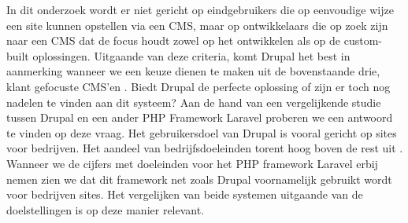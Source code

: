 \label{ch:voor wie?}

In dit onderzoek wordt er niet gericht op eindgebruikers die op eenvoudige wijze een site kunnen opstellen via een CMS, maar op ontwikkelaars die op zoek zijn naar een CMS dat de focus houdt zowel op het ontwikkelen als op de custom-built oplossingen.
\newline\newline
Uitgaande van deze criteria, komt Drupal het best in aanmerking wanneer we een keuze dienen te maken uit de bovenstaande drie, klant gefocuste CMS'en \citep{W3Techs2016UsageWebsites}. Biedt Drupal de perfecte oplossing of zijn er toch nog nadelen te vinden aan dit systeem? Aan de hand van een vergelijkende studie tussen Drupal en een ander PHP Framework Laravel proberen we een antwoord te vinden op deze vraag. 
\newline\newline
Het gebruikersdoel van Drupal is vooral gericht op sites voor bedrijven. Het aandeel van bedrijfsdoeleinden torent hoog boven de rest uit \citep{BuiltWith2016DrupalStatistics}. Wanneer we de cijfers met doeleinden voor het PHP framework Laravel erbij nemen zien we dat dit framework net zoals Drupal voornamelijk gebruikt wordt voor bedrijven sites. Het vergelijken van beide systemen uitgaande van de doelstellingen is op deze manier relevant. 